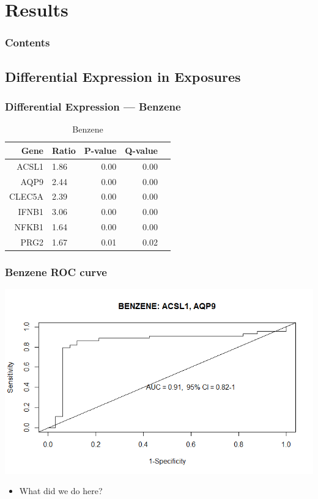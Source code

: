 \documentclass{beamer}
\begin{document}
\section{Results}

\begin{frame}
        \frametitle{Contents}
        \tableofcontents[currentsection,currentsubsection,hideothersubsections,sectionstyle=show/shaded]
\end{frame}

\subsection{Differential Expression in Exposures}

\begin{frame}[fragile]
  	\frametitle{Differential Expression --- Benzene}
 		\begin{table}[ht]
		\caption {Benzene} \label{tab:benzene} 
		\centering
		\begin{tabular}{rlrrr}
  			\hline
 			Gene & Ratio & P-value & Q-value \\ 
  			\hline
			ACSL1 & 1.86 & 0.00 & 0.00 \\ 
  			AQP9 & 2.44 & 0.00 & 0.00 \\ 
  			CLEC5A & 2.39 & 0.00 & 0.00 \\ 
  			IFNB1 & 3.06 & 0.00 & 0.00 \\ 
  			NFKB1 & 1.64 & 0.00 & 0.00 \\ 
  			PRG2 & 1.67 & 0.01 & 0.02 \\ 
   			\hline
		\end{tabular}
		\end{table}
\end{frame}

\begin{frame}
	 \frametitle{Benzene ROC curve}
		\centering
	 	\includegraphics[scale=0.45]{../paper/figs/benzene1.png} 
                \begin{itemize}
			\item What did we do here?
		\end{itemize}

\end{frame}
\end{document}
